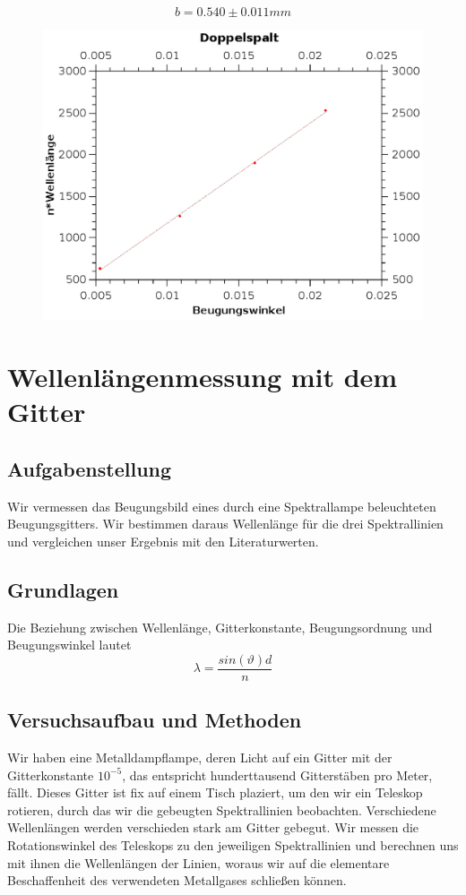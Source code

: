 \documentclass{article}
\begin{document}
$$\boxed{b=0.540 \pm 0.011 mm}$$
\begin{center}
\begin{figure}[H]
\includegraphics[scale=0.7]{doppelspalt.eps} 
\end{figure}
\end{center}
\section{Wellenlängenmessung mit dem Gitter}

\subsection{Aufgabenstellung}
Wir vermessen das Beugungsbild eines durch eine Spektrallampe beleuchteten Beugungsgitters. Wir bestimmen daraus Wellenlänge für die drei Spektrallinien und vergleichen unser Ergebnis mit den Literaturwerten.
\subsection{Grundlagen}
Die Beziehung zwischen Wellenlänge, Gitterkonstante, Beugungsordnung und Beugungswinkel lautet \\
\begin{equation}
\label{gitter}
\lambda=\frac{sin(\vartheta)d}{n}
\end{equation}
\subsection{Versuchsaufbau und Methoden}
Wir haben eine Metalldampflampe, deren Licht auf ein Gitter mit der Gitterkonstante $10^{-5}$, das entspricht hunderttausend Gitterstäben pro Meter, fällt. Dieses Gitter ist fix auf einem Tisch plaziert, um den wir ein Teleskop rotieren, durch das wir die gebeugten Spektrallinien beobachten. Verschiedene Wellenlängen werden verschieden stark am Gitter gebegut. Wir messen die Rotationswinkel des Teleskops zu den jeweiligen Spektrallinien und berechnen uns mit ihnen die Wellenlängen der Linien, woraus wir auf die elementare Beschaffenheit des verwendeten Metallgases schließen können.
\end{document}
